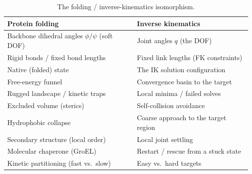 %

\begin{table}[t]
\centering
\caption{The folding / inverse-kinematics isomorphism.}
\label{tab:isomorphism}
\begin{tabular}{@{}ll@{}}
\toprule
\textbf{Protein folding} & \textbf{Inverse kinematics} \\
\midrule
Backbone dihedral angles $\phi/\psi$ (soft DOF) & Joint angles $q$ (the DOF) \\
Rigid bonds / fixed bond lengths       & Fixed link lengths (FK constraints) \\
Native (folded) state                  & The IK solution configuration \\
Free-energy funnel                     & Convergence basin to the target \\
Rugged landscape / kinetic traps       & Local minima / failed solves \\
Excluded volume (sterics)              & Self-collision avoidance \\
Hydrophobic collapse                   & Coarse approach to the target region \\
Secondary structure (local order)      & Local joint settling \\
Molecular chaperone (GroEL)            & Restart / rescue from a stuck state \\
Kinetic partitioning (fast vs.\ slow)  & Easy vs.\ hard targets \\
\bottomrule
\end{tabular}
\end{table}

